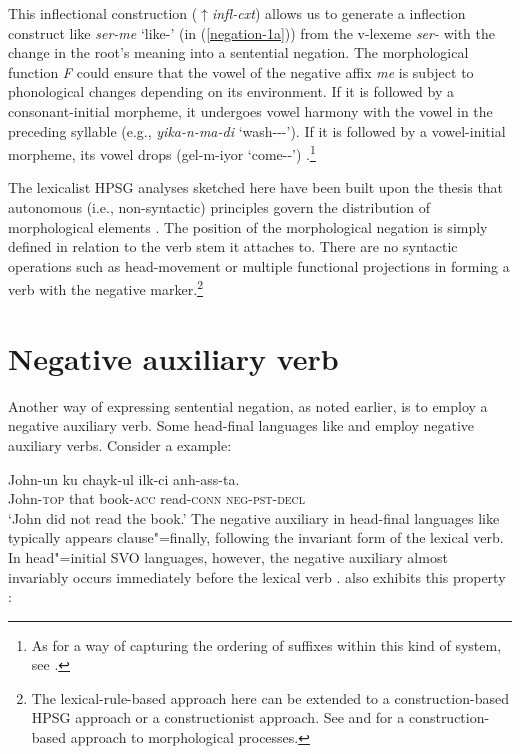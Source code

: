 \documentclass[output=paper
	        ,collection
	        ,collectionchapter
 	        ,biblatex
                ,babelshorthands
                ,newtxmath
                ,draftmode
                ,colorlinks, citecolor=brown
]{langscibook}
\begin{document}
\begin{exe}
\begin{xlist}
\begin{exe}
\begin{xlist}
{This inflectional construction ($\uparrow$\textit{infl-cxt}) allows us to generate a  inflection construct like \textit{ser-me} `like-\NEG' (in (\ref{negation-1a})) from the v-lexeme \textit{ser-} with the change in the root's meaning into a sentential negation. The morphological function \textit{F} could ensure that the vowel of the negative affix \textit{me} is subject to phonological changes depending on its environment. If it is followed by a consonant-initial morpheme, it undergoes vowel harmony with the vowel in the preceding syllable (e.g., \textit{yika-n-ma-di} `wash-\REFL-\NEG-\PST'). If it is followed by a vowel-initial morpheme, its vowel drops (gel-m-iyor `come-\NEG-\PROG')  \citep[see]{kelepir}.\footnote{As
 for a way of capturing the ordering of suffixes within this kind of system,
 see \citet{Kim:16}.}
}\fi

The lexicalist HPSG analyses sketched here
 have been built upon the
thesis that autonomous (i.e., non-syntactic) principles govern the
distribution of morphological elements \citep{BM:95}.
The position of the morphological negation is simply
defined in relation to
the verb stem it attaches to. There are no syntactic operations such
as head-movement or multiple functional projections in forming
a verb with the negative marker.\footnote{The lexical-rule-based
approach here can be extended to a construction-based HPSG
approach or a constructionist approach. See
\citet{Sag:12} and \citet{Hilpert:16} for a construction-based
approach to morphological processes.}



\section{Negative auxiliary verb}
\label{sec-negative-auxiliary-verb}

Another way of expressing sentential negation, as noted earlier, is to employ
a negative auxiliary
verb. Some head-final languages like  and  employ
negative auxiliary verbs. Consider a  example:

\ea
\gll John-un ku chayk-ul ilk-ci anh-ass-ta. \\
     John-\textsc{top} that book-\textsc{acc} read-\textsc{conn} \textsc{neg}-\textsc{pst}-\textsc{decl}  \\
\glt `John did not read the book.'
\z
%
%
\noindent
The negative auxiliary in head-final languages like 
typically appears clause"=finally, following the invariant form of the lexical verb.
In head"=initial SVO languages, however, the negative auxiliary
almost invariably occurs immediately before the lexical verb
\citep{Payne:85}.  also exhibits this property \citep{Mitchell:91}:


\end{xlist}
\end{exe}
\end{xlist}
\end{exe}
\end{document}
